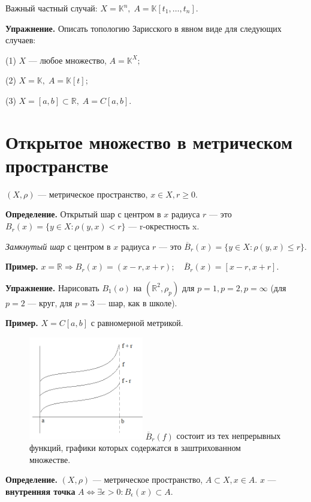 \documentclass[12pt,a4paper]{article}
\begin{document}
Важный частный случай: $X = \mathbb{K}^n, \; A = \mathbb{K}[t_1, \ldots, t_n].$

\textbf{Упражнение.} Описать топологию Зарисского в явном виде для следующих случаев:

(1) $X$ --- любое множество, $A = \mathbb{K}^X;$

(2) $X = \mathbb{K}, \; A = \mathbb{K}[t];$

(3) $X = [a, b] \subset \mathbb{R}, \; A = C[a,b].$

\section{Открытое множество в метрическом пространстве}

$(X, \rho)$ --- метрическое пространство, $x \in X, r \geqslant 0$.

\textbf{Определение.} Открытый шар с центром в $x$ радиуса $r$ --- это 
$B_r(x) = \{ y \in X: \rho(y, x) < r\}$ --- r-окрестность x. 

\textit{Замкнутый шар} с центром в $x$ радиуса $r$ --- это
$\overline{B}_r(x) = \{ y\in X: \rho(y, x) \leqslant r\}.$

\textbf{Пример.} $x = \mathbb{R} \Rightarrow B_r(x) = (x - r, x + r); \quad \overline{B}_r(x) = [x - r, x+r].$

\textbf{Упражнение.} Нарисовать $B_1(o)$ на $(\mathbb{R}^2, \rho_p)$ для $p = 1, p = 2, p = \infty$ (для $p = 2$ --- круг, для $p = 3$ --- шар, как в школе).

\textbf{Пример.} $X = C[a,b]$ с равномерной метрикой.

\begin{figure}
	\includegraphics[width = 5cm]{lect2_1.png}
	$\overline{B}_r(f)$ состоит из тех непрерывных функций, графики которых содержатся в заштрихованном множестве.
\end{figure}

\textbf{Определение.} $(X, \rho)$ --- метрическое пространство, $A \subset X, x \in A.$
$x$ --- \textbf{внутренняя точка} $A \Leftrightarrow \exists \epsilon > 0: B_{\epsilon}(x) \subset A.$ 
\end{document}

